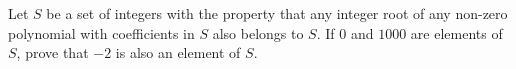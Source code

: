 \documentclass[varwidth]{standalone}
\begin{document}
    Let $S$ be a set of integers with the property that any integer root of any non-zero polynomial with coefficients in $S$ also belongs to $S$. If $0$ and $1000$ are elements of $S$, prove that $-2$ is also an element of $S$.
\end{document}
